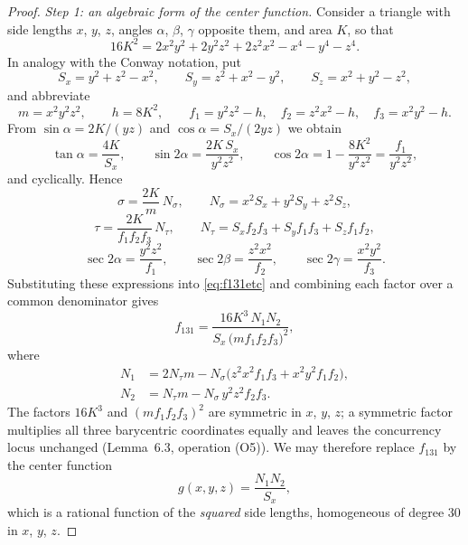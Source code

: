 \documentclass[12pt,a4paper]{amsart}
\theoremstyle{remark}
\begin{document}
{\begin{proof}
\emph{Step 1: an algebraic form of the center function.}
Consider a triangle with side lengths $x$, $y$, $z$, angles $\alpha$,
$\beta$, $\gamma$ opposite them, and area $K$, so that
\[
16K^2=2x^2y^2+2y^2z^2+2z^2x^2-x^4-y^4-z^4 .
\]
In analogy with the Conway notation, put
\[
S_x=y^2+z^2-x^2,\qquad S_y=z^2+x^2-y^2,\qquad S_z=x^2+y^2-z^2,
\]
and abbreviate
\[
m=x^2y^2z^2,\qquad h=8K^2,\qquad
f_1=y^2z^2-h,\quad f_2=z^2x^2-h,\quad f_3=x^2y^2-h .
\]
From $\sin\alpha=2K/(yz)$ and $\cos\alpha=S_x/(2yz)$ we obtain
\[
\tan\alpha=\frac{4K}{S_x},\qquad
\sin 2\alpha=\frac{2K\,S_x}{y^2z^2},\qquad
\cos 2\alpha=1-\frac{8K^2}{y^2z^2}=\frac{f_1}{y^2z^2},
\]
and cyclically.  Hence
\[
\sigma=\frac{2K}{m}\,N_\sigma,
\qquad
N_\sigma=x^2S_x+y^2S_y+z^2S_z,
\]
\[
\tau=\frac{2K}{f_1f_2f_3}\,N_\tau,
\qquad
N_\tau=S_xf_2f_3+S_yf_1f_3+S_zf_1f_2,
\]
\[
\sec 2\alpha=\frac{y^2z^2}{f_1},
\qquad
\sec 2\beta=\frac{z^2x^2}{f_2},
\qquad
\sec 2\gamma=\frac{x^2y^2}{f_3}.
\]
Substituting these expressions into \eqref{eq:f131etc} and combining
each factor over a common denominator gives
\begin{equation}\label{eq:f131alg}
f_{131}
=\frac{16K^3\,N_1N_2}{S_x\,\bigl(mf_1f_2f_3\bigr)^{2}},
\end{equation}
where
\begin{align}
N_1&=2N_\tau m-N_\sigma\bigl(z^2x^2f_1f_3+x^2y^2f_1f_2\bigr),
\label{eq:N1}\\
N_2&=N_\tau m-N_\sigma\,y^2z^2f_2f_3.
\label{eq:N2}
\end{align}
The factors $16K^3$ and $(mf_1f_2f_3)^{2}$ are symmetric in $x$, $y$,
$z$; a symmetric factor multiplies all three barycentric coordinates
equally and leaves the concurrency locus unchanged (Lemma~6.3,
operation (O5)).  We may therefore replace $f_{131}$ by the center
function
\begin{equation}\label{eq:g131}
g(x,y,z)=\frac{N_1N_2}{S_x},
\end{equation}
which is a rational function of the \emph{squared} side lengths,
homogeneous of degree $30$ in $x$, $y$, $z$.


\end{proof}}
\end{document}
